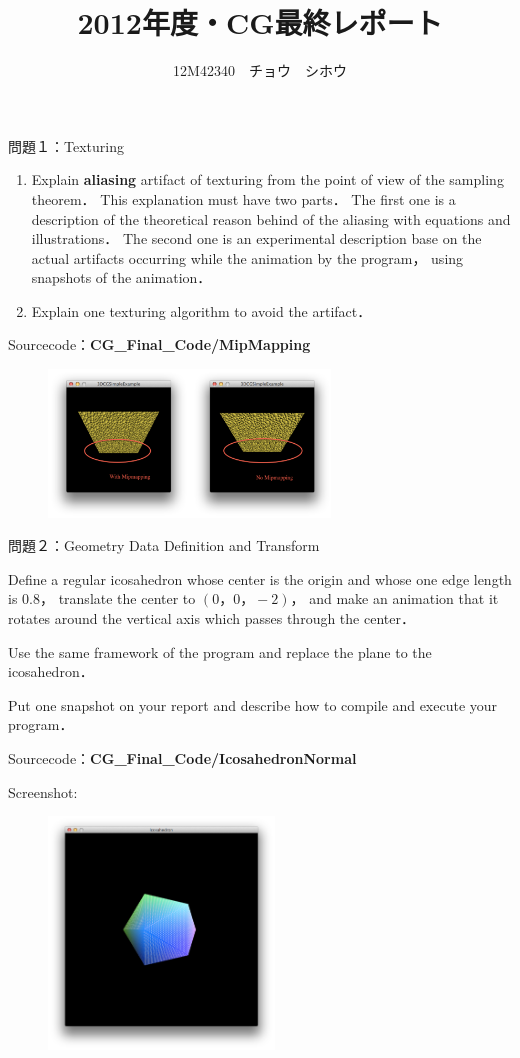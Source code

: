\documentclass[a4paper,11pt]{jsarticle}
\title{2012年度・CG最終レポート}
\author{12M42340　チョウ　シホウ}
\numberwithin{theorem}{section}  %
\numberwithin{equation}{section} %
\begin{document}
{}
\renewcommand{\thepart}{\arabic{part}}


\begin{itembox}[l]{問題１：Texturing}
\begin{enumerate}
\item
Explain {\bf aliasing} artifact of texturing from the point of view of the sampling theorem． This explanation must
have two parts． The first one is a description of the theoretical reason behind of the aliasing with equations and
illustrations． The second one is an experimental description base on the actual artifacts occurring while the animation
by the program， using snapshots of the animation．
\item Explain one texturing algorithm to avoid the artifact．
\end{enumerate}
\end{itembox}
Sourcecode：{\bf CG\_Final\_Code/MipMapping}
\begin{figure}[H]
\includegraphics[bb=0 0 444 451,width=7.5cm]{mip_mapping.pdf}
\end{figure}
\newpage

\begin{itembox}[l]{問題２：Geometry Data Definition and Transform}

Define a regular icosahedron whose center is the origin and whose one edge length is $0.8$， translate the center to
$(0，0，-2)$， and make an animation that it rotates around the vertical axis which passes through the center．

Use the same framework of the program and replace the plane to the icosahedron．

Put one snapshot on your report and describe how to compile and execute your program．
\end{itembox}

Sourcecode：{\bf CG\_Final\_Code/IcosahedronNormal}

Screenshot:
\begin{figure}[H]
\includegraphics[bb=0 0 444 751,width=6cm]{Icosahedron.pdf}\\
\end{figure}
\end{document}
